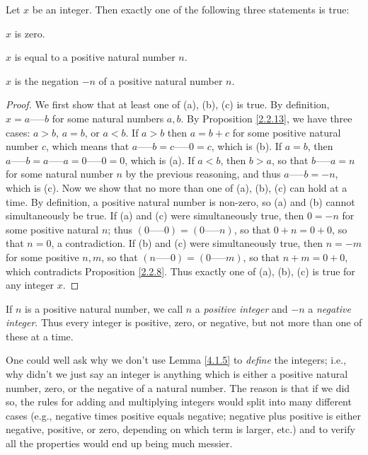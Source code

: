 \begin{lemma}\label{4.1.5}
    Let \(x\) be an integer.
    Then exactly one of the following three statements is true:
    \begin{enumerate*}
        \item \(x\) is zero.
        \item \(x\) is equal to a positive natural number \(n\).
        \item \(x\) is the negation \(-n\) of a positive natural number \(n\).
    \end{enumerate*}
\end{lemma}

\begin{proof}
    We first show that at least one of (a), (b), (c) is true.
    By definition, \(x = a \text{-----} b\) for some natural numbers \(a, b\).
    By Proposition \ref{2.2.13}, we have three cases: \(a > b\), \(a = b\), or \(a < b\).
    If \(a > b\) then \(a = b + c\) for some positive natural number \(c\), which means that \(a \text{-----} b = c \text{-----} 0 = c\), which is (b).
    If \(a = b\), then \(a \text{-----} b = a \text{-----} a = 0 \text{-----} 0 = 0\), which is (a).
    If \(a < b\), then \(b > a\), so that \(b \text{-----} a = n\) for some natural number \(n\) by the previous reasoning, and thus \(a \text{-----} b = -n\), which is (c).
    Now we show that no more than one of (a), (b), (c) can hold at a time.
    By definition, a positive natural number is non-zero, so (a) and (b) cannot simultaneously be true.
    If (a) and (c) were simultaneously true, then \(0 = -n\) for some positive natural \(n\);
    thus \((0 \text{-----} 0) = (0 \text{-----} n)\), so that \(0 + n = 0 + 0\), so that \(n = 0\), a contradiction.
    If (b) and (c) were simultaneously true, then \(n = -m\) for some positive \(n, m\), so that \((n \text{-----} 0) = (0 \text{-----} m)\), so that \(n + m = 0 + 0\), which contradicts Proposition \ref{2.2.8}.
    Thus exactly one of (a), (b), (c) is true for any integer \(x\).
\end{proof}

\begin{note}
    If \(n\) is a positive natural number, we call \(n\) a \emph{positive integer} and \(-n\) a \emph{negative integer}.
    Thus every integer is positive, zero, or negative, but not more than one of these at a time.
\end{note}

\begin{note}
    One could well ask why we don’t use Lemma \ref{4.1.5} to \emph{define} the integers;
    i.e., why didn’t we just say an integer is anything which is either a positive natural number, zero, or the negative of a natural number.
    The reason is that if we did so, the rules for adding and multiplying integers would split into many different cases (e.g., negative times positive equals negative; negative plus positive is either negative, positive, or zero, depending on which term is larger, etc.) and to verify all the properties would end up being much messier.
\end{note}

